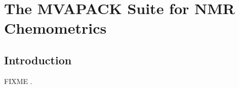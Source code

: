 
\chapter{The MVAPACK Suite for NMR Chemometrics}

\section{Introduction}

FIXME \cite{worley:acscb2014}.




